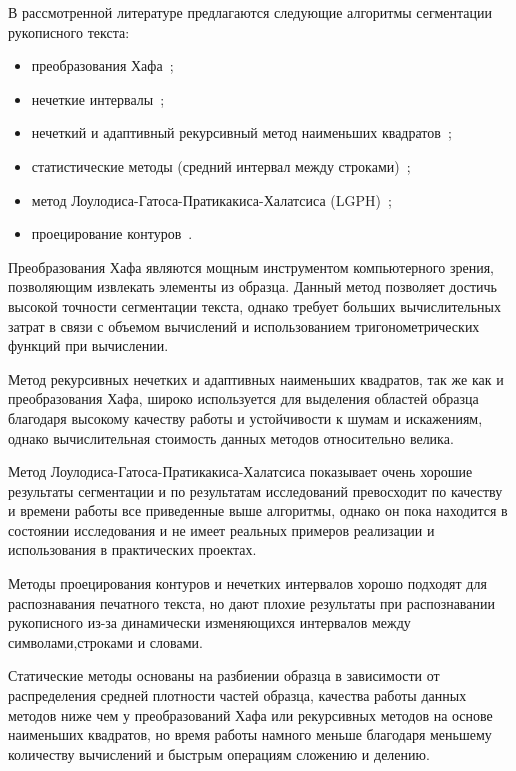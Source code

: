 В рассмотренной литературе предлагаются следующие алгоритмы сегментации рукописного текста:
\begin{itemize}
  \item преобразования Хафа~\cite{louloudis_gatos_pratikakis_halatsis};
  \item нечеткие интервалы~\cite{louloudis_gatos_pratikakis_halatsis};
  \item нечеткий и адаптивный рекурсивный метод наименьших \mbox{квадратов~\cite{louloudis_gatos_pratikakis_halatsis};}
  \item статистические методы (средний интервал между строками)~\cite{gomathi_umadevi_mohanavel};
  \item метод Лоулодиса-Гатоса-Пратикакиса-Халатсиса (LGPH)~\cite{louloudis_gatos_pratikakis_halatsis};
  \item проецирование контуров~\cite{louloudis_gatos_pratikakis_halatsis}.
\end{itemize}

Преобразования Хафа являются мощным инструментом компьютерного зрения, позволяющим извлекать элементы из образца. Данный метод позволяет достичь высокой точности сегментации текста, однако требует больших вычислительных затрат в связи с объемом вычислений и использованием тригонометрических функций при вычислении.

Метод рекурсивных нечетких и адаптивных наименьших квадратов, так же как и преобразования Хафа, широко используется для выделения областей образца благодаря высокому качеству работы и устойчивости к шумам и искажениям, однако вычислительная стоимость данных методов относительно велика.

Метод Лоулодиса-Гатоса-Пратикакиса-Халатсиса показывает очень хорошие результаты сегментации и по результатам исследований превосходит по качеству и времени работы все приведенные выше алгоритмы, однако он пока находится в состоянии исследования и не имеет реальных примеров реализации и использования в практических проектах.

Методы проецирования контуров и нечетких интервалов хорошо подходят для распознавания печатного текста, но дают плохие результаты при распознавании рукописного из-за динамически изменяющихся интервалов между символами,строками и словами.

Статические методы основаны на разбиении образца в зависимости от распределения средней плотности частей образца, качества работы данных методов ниже чем у преобразований Хафа или рекурсивных методов на основе наименьших квадратов, но время работы намного меньше благодаря меньшему количеству вычислений и быстрым операциям сложению и делению.

